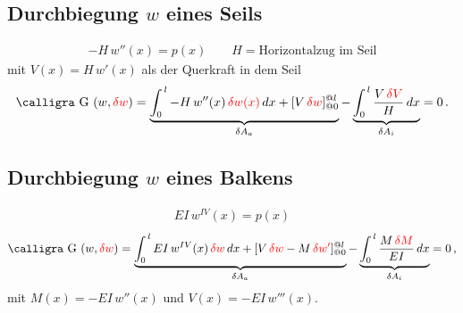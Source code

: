 {{{{{\textcolor{sectionTitleBlue}{\subsection{Durchbiegung $w$ eines Seils}}}
\vspace{-0.7cm}
\begin{align}
- H\,w''(x) = p(x) \qquad H = \text{Horizontalzug im Seil}
\end{align}
mit $V(x) = H\,w'(x)$ als der Querkraft in dem Seil
\begin{align}
\text{\normalfont\calligra G\,\,}(w,\textcolor{red}{\delta w}) = \underbrace{\int_0^{\,l} - H\,w''(x)\,\textcolor{red}{\delta w(x)}\,dx + [V\,\textcolor{red}{\delta w}]_{@0}^{@l}}_{\delta A_a}  - \underbrace{\int_0^{\,l} \frac{V\,\textcolor{red}{\delta V}}{H}\,dx}_{\delta A_i}  = 0\,.
\end{align}%
{\textcolor{sectionTitleBlue}{\subsection{Durchbiegung $w$ eines Balkens}}}
\vspace{-0.7cm}
\begin{align}\label{Eq115}
EI\,w^{IV}(x) = p(x)
\end{align}
\begin{align}\label{Eq107}
\text{\normalfont\calligra G\,\,}(w,\textcolor{red}{\delta w}) = \underbrace{\int_0^{\,l} EI\,w^{IV}(x)\,\textcolor{red}{\delta w}\,dx + [V\,\textcolor{red}{\delta w} - M\,\textcolor{red}{\delta w'}]_{@0}^{@l}}_{\delta A_a}  - \underbrace{\int_0^{\,l} \frac{M\,\textcolor{red}{\delta M}}{EI}\,dx}_{\delta A_i} = 0\,,
\end{align}
mit $M(x) = - EI\,w''(x)$ und $V(x) = - EI\,w'''(x)$.

}}}}
